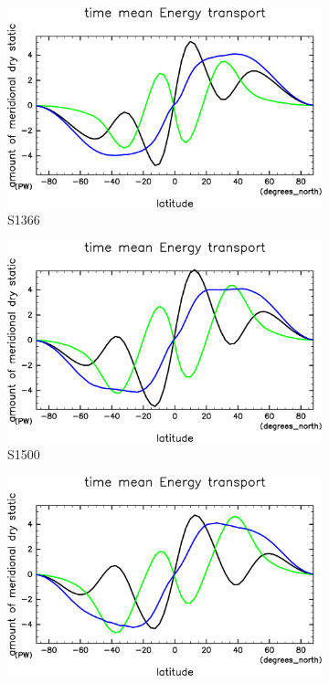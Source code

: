 \documentclass[body]{subfiles}
\begin{document}
\begin{figure}[t]
	\centering
	\begin{subfigure}{.4\textwidth}
		\centering
		\includegraphics[width=\columnwidth]{S1366/EngyFlx,time=14600:14965-crop-rotate.pdf}
		\caption{S1366}\label{EnFlxS1366}
	\end{subfigure}
	\begin{subfigure}{.4\textwidth}
		\centering
		\includegraphics[width=\columnwidth]{S1500/EngyFlx,time=3650:4015-crop-rotate.pdf}
		\caption{S1500}\label{EnFlxS1500}
	\end{subfigure}
	\begin{subfigure}{.4\textwidth}
		\centering
		\includegraphics[width=\columnwidth]{S1600/EngyFlx,time=3650:4015-crop-rotate.pdf}

\end{subfigure}
\end{figure}
\end{document}
